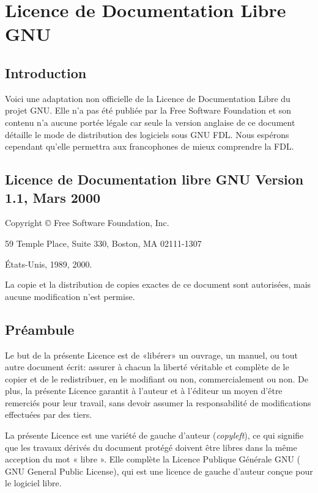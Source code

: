 
\chapter{Licence de Documentation Libre GNU\label{gfdl}}

\section{Introduction}

Voici une adaptation non officielle de la Licence de Documentation
Libre du projet GNU. Elle n'a pas été publiée par la Free Software
Foundation et son contenu n'a aucune portée légale car seule la version
anglaise de ce document détaille le mode de distribution des logiciels
sous GNU FDL. Nous espérons cependant qu'elle permettra aux francophones
de mieux comprendre la FDL. 

\section{Licence de Documentation libre GNU Version 1.1, Mars 2000}

Copyright © Free Software Foundation, Inc.

59 Temple Place, Suite 330, Boston, MA 02111-1307 

États-Unis, 1989, 2000. 

La copie et la distribution de copies exactes de ce document
sont autorisées, mais aucune modification n'est permise. 

\section{Préambule} 

Le but de la présente Licence est de «libérer» un ouvrage,
un manuel, ou tout autre document écrit: assurer à chacun la liberté
véritable et complète de le copier et de le redistribuer, en le modifiant
ou non, commercialement ou non. De plus, la présente Licence garantit
à l'auteur et à l'éditeur un moyen d'être remerciés pour leur travail,
sans devoir assumer la responsabilité de modifications effectuées
par des tiers. 

La présente Licence est une variété de gauche d'auteur (\emph{copyleft}),
ce qui signifie que les travaux dérivés du document protégé doivent
être libres dans la même acception du mot « libre ». Elle complète
la Licence Publique Générale GNU ( GNU General Public License), qui
est une licence de gauche d'auteur conçue pour le logiciel libre. 

